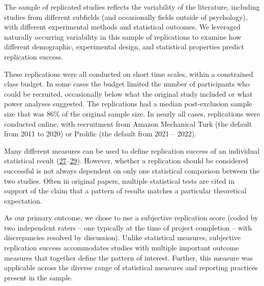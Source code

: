 \documentclass[
  english,
  a4paper,
]{article}
\begin{document}
The sample of replicated studies reflects the variability of the literature, including studies from different subfields (and occasionally fields outside of psychology), with different experimental methods and statistical outcomes. We leveraged naturally occurring variability in this sample of replications to examine how different demographic, experimental design, and statistical properties predict replication success.

These replications were all conducted on short time scales, within a constrained class budget. In some cases the budget limited the number of participants who could be recruited, occasionally below what the original study included or what power analyses suggested. The replications had a median post-exclusion sample size that was 86\% of the original sample size. In nearly all cases, replications were conducted online, with recruitment from Amazon Mechanical Turk (the default from 2011 to 2020) or Prolific (the default from 2021 -- 2022).

Many different measures can be used to define replication success of an individual statistical result (\protect\hyperlink{ref-simonsohn2015}{27}--\protect\hyperlink{ref-mathur2020}{29}). However, whether a replication should be considered successful is not always dependent on only one statistical comparison between the two studies. Often in original papers, multiple statistical tests are cited in support of the claim that a pattern of results matches a particular theoretical expectation.

As our primary outcome, we chose to use a subjective replication score (coded by two independent raters -- one typically at the time of project completion -- with discrepancies resolved by discussion). Unlike statistical measures, subjective replication success accommodates studies with multiple important outcome measures that together define the pattern of interest. Further, this measure was applicable across the diverse range of statistical measures and reporting practices present in the sample.
\end{document}
